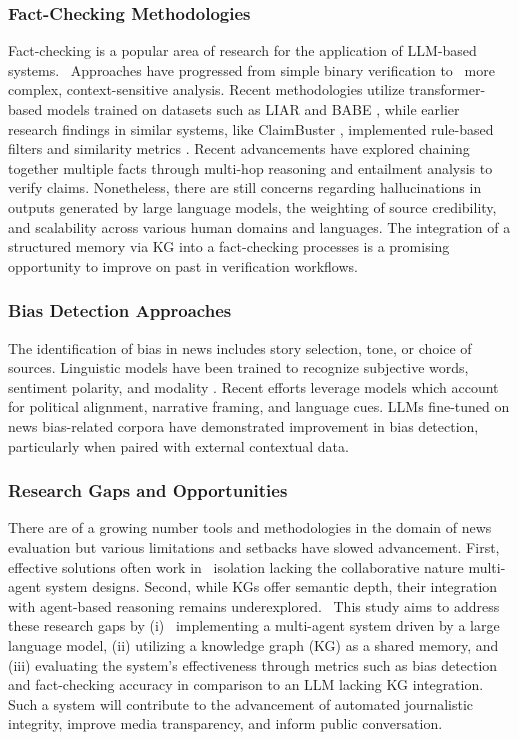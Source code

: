 \documentclass{scrartcl}
\begin{document}
\subsubsection{Fact-Checking Methodologies}
Fact-checking is a popular area of research for the application of LLM-based systems.  Approaches have progressed from simple binary verification to  more complex, context-sensitive analysis. Recent methodologies utilize transformer-based models trained on datasets such as LIAR\cite{r26} and BABE \cite{r27}, while earlier research findings in similar systems, like ClaimBuster \cite{r28}, implemented rule-based filters and similarity metrics \cite{r29}. Recent advancements have explored chaining together multiple facts through multi-hop reasoning and entailment analysis to verify claims\cite{r30}. Nonetheless, there are still concerns regarding hallucinations in outputs generated by large language models, the weighting of source credibility, and scalability across various human domains and languages. The integration of a structured memory via KG into a fact-checking processes is a promising opportunity to improve on past in verification workflows.

\subsubsection{Bias Detection Approaches}
The identification of bias in news includes story selection, tone, or choice of sources. Linguistic models have been trained to recognize subjective words, sentiment polarity, and modality \cite{r31}. Recent efforts leverage models which account for political alignment, narrative framing, and language cues\cite{r32}. LLMs fine-tuned on news bias-related corpora have demonstrated improvement in bias detection, particularly when paired with external contextual data.


\subsubsection{Research Gaps and Opportunities}

There are of a growing number tools and methodologies in the domain of news evaluation but various limitations and setbacks have slowed advancement. First, effective solutions often work in  isolation lacking the collaborative nature multi-agent system designs. Second, while KGs offer semantic depth, their integration with agent-based reasoning remains underexplored.  This study aims to address these research gaps by (i)  implementing a multi-agent system driven by a large language model, (ii) utilizing a knowledge graph (KG) as a shared memory, and (iii) evaluating the system's effectiveness through metrics such as bias detection and fact-checking accuracy in comparison to an LLM lacking KG integration. Such a system will contribute to the advancement of automated journalistic integrity, improve media transparency, and inform public conversation.
\end{document}
